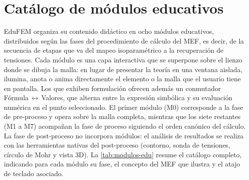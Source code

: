 \section{Catálogo de módulos educativos}
\label{sec:catalogo-modulos-edu}

EduFEM organiza su contenido didáctico en ocho módulos educativos, distribuidos según las fases del procedimiento de cálculo del MEF, es decir, de la secuencia de etapas que va del mapeo isoparamétrico a la recuperación de tensiones. Cada módulo es una capa interactiva que se superpone sobre el lienzo donde se dibuja la malla: en lugar de presentar la teoría en una ventana aislada, ilumina, anota o anima directamente el elemento o la malla que el usuario tiene en pantalla. Los que exhiben formulación ofrecen además un conmutador Fórmula\,$\leftrightarrow$\,Valores, que alterna entre la expresión simbólica y su evaluación numérica en el punto seleccionado. El primer módulo (M0) corresponde a la fase de pre-proceso y opera sobre la malla completa, mientras que los siete restantes (M1 a M7) acompañan la fase de proceso siguiendo el orden canónico del cálculo. La fase de post-proceso no incorpora módulos: el análisis de resultados se realiza con las herramientas nativas del post-proceso (contorno, sonda de tensiones, círculo de Mohr y vista 3D). La \autoref{tab:modulos-edu} resume el catálogo completo, indicando para cada módulo su fase, el concepto del MEF que ilustra y el atajo de teclado asociado.

